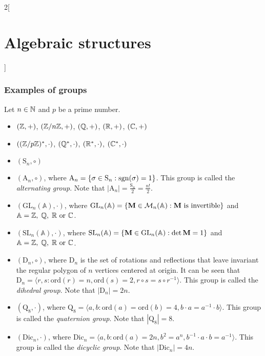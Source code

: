 \documentclass[../../../main_math.tex]{subfiles}
\begin{document}
\begin{multicols}{2}[\section{Algebraic structures}]
  \subsubsection{Examples of groups}\label{AS_examples}
  Let $n\in\mathbb{N}$ and $p$ be a prime number.
  \begin{itemize}
    \item $(\mathbb{Z},+)$, $(\mathbb{Z}/n\mathbb{Z},+)$, $(\mathbb{Q},+)$, $(\mathbb{R},+)$, $(\mathbb{C},+)$
    \item $((\mathbb{Z}/p\mathbb{Z})^*,\cdot)$, $(\mathbb{Q}^*,\cdot)$, $(\mathbb{R}^*,\cdot)$, $(\mathbb{C}^*,\cdot)$
    \item $(\text{S}_n,\circ)$
    \item $(\text{A}_n,\circ)$, where $\text{A}_n=\{\sigma\in \text{S}_n:\operatorname{sgn}(\sigma)=1\}$. This group is called the \emph{alternating group}. Note that $|\text{A}_n|=\frac{\text{S}_n}{2}=\frac{n!}{2}$.
    \item $(\text{GL}_n(\mathbb{A}),\cdot)$, where $\text{GL}_n(\mathbb{A})=\{\boldsymbol{\mathrm{M}}\in\mathcal{M}_n(\mathbb{A}):\boldsymbol{\mathrm{M}}\text{ is invertible}\}$ and $\mathbb{A}=\mathbb{Z},\;\mathbb{Q},\;\mathbb{R}\text{ or }\mathbb{C}$.
    \item $(\text{SL}_n(\mathbb{A}),\cdot)$, where $\text{SL}_n(\mathbb{A})=\{\boldsymbol{\mathrm{M}}\in\text{GL}_n(\mathbb{A}):\det\boldsymbol{\mathrm{M}}=1\}$ and $\mathbb{A}=\mathbb{Z},\;\mathbb{Q},\;\mathbb{R}\text{ or }\mathbb{C}$.
    \item $(\text{D}_n,\circ)$, where $\text{D}_n$ is the set of rotations and reflections that leave invariant the regular polygon of $n$ vertices centered at origin. It can be seen that $\text{D}_n=\langle r,s:\text{ord}(r)=n,\text{ord}(s)=2,r\circ s=s\circ r^{-1}\rangle$. This group is called the \emph{dihedral group}. Note that $|\text{D}_n|=2n$.
    \item $(\text{Q}_8,\cdot)$, where $\text{Q}_8=\langle a,b:\text{ord}(a)=\text{ord}(b)=4,b\cdot a=a^{-1}\cdot b\rangle$. This group is called the \emph{quaternion group}. Note that $|\text{Q}_8|=8$.
    \item $(\text{Dic}_n,\cdot)$, where $\text{Dic}_n=\langle a,b:\text{ord}(a)=2n,b^2=a^n,b^{-1}\cdot a\cdot b=a^{-1}\rangle$. This group is called the \emph{dicyclic group}. Note that $|\text{Dic}_n|=4n$.
  \end{itemize}

\end{multicols}
\end{document}
